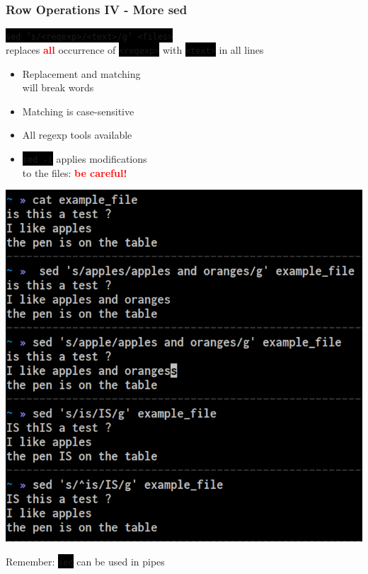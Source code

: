 \documentclass[unknownkeysallowed, 10pt, a4 paper, handout]{beamer}
\newcommand{\focus}[1]{\textbf{\textcolor{red}{#1}}}
\newcommand{\code}[1]{\colorbox{black}{\color{green}\texttt{#1}}}
\newcommand{\sidebyside}[5]{
  \begin{minipage}{#1\textwidth}
    #2
  \end{minipage} #3 \begin{minipage}{#4\textwidth}
    #5
  \end{minipage}
}
\begin{document}
\begin{frame}
  \begin{center}
    \frametitle{Row Operations IV - More sed}

     \code{sed 's/<regexp>/<text>/g' <files>}\\
     replaces \focus{all} occurrence of \code{<regexp>} with \code{<text>} in all lines

   \sidebyside{0.54}{
     \begin{itemize}
        \item Replacement and matching\\
          will break words
        \item Matching is case-sensitive
        \item All regexp tools available
        \item \code{sed -i} applies modifications\\
          to the files: \focus{be careful!}
      \end{itemize}
    }{\hfill}{0.43}{
      \begin{center}
        \includegraphics[width=1.00\textwidth]{pics/sed-2.png}
      \end{center}
    }

    Remember: \code{sed} can be used in pipes
  \end{center}
\end{frame}
\end{document}
